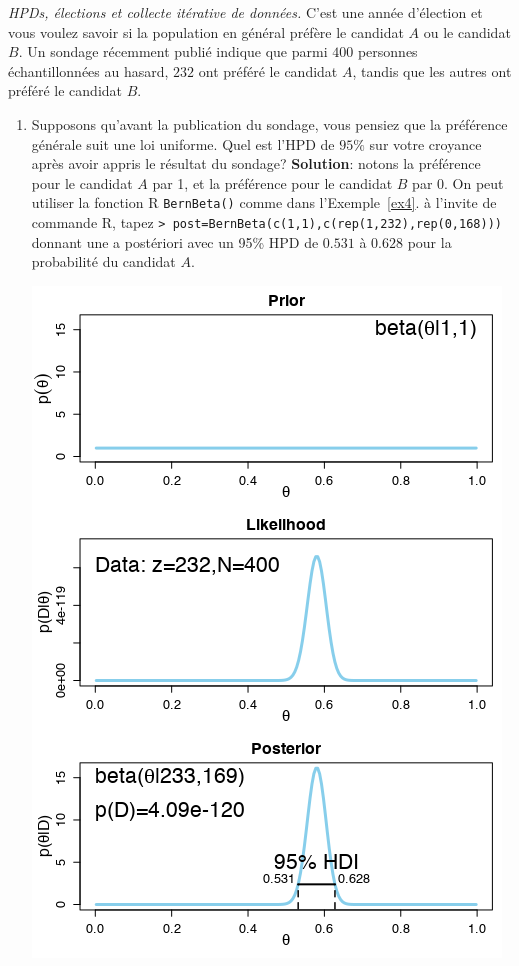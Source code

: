 \begin{Exemple}
\textit{HPDs, \'elections et collecte it\'erative de donn\'ees.} C'est une ann\'ee d'\'election et vous voulez savoir si la population en g\'en\'eral pr\'ef\`ere le candidat $A$ ou le candidat $B$. Un sondage r\'ecemment publi\'e indique que parmi $400$ personnes \'echantillonn\'ees au hasard, $232$ ont pr\'ef\'er\'e le candidat $A$, tandis que les autres ont pr\'ef\'er\'e le candidat $B$.
\begin{enumerate}[noitemsep,label=(\alph*)]
\item Supposons qu'avant la publication du sondage, vous pensiez que la pr\'ef\'erence g\'en\'erale suit une loi uniforme. Quel est l'HPD de $95\%$ sur votre croyance apr\`es avoir appris le r\'esultat du sondage?  
\newl 
\textbf{Solution}: notons la pr\'ef\'erence pour le candidat $A$ par 1, et la pr\'ef\'erence pour le candidat $B$ par 0.  On peut utiliser la fonction R  \texttt{BernBeta()} comme dans l'Exemple~\ref{ex4}. \`a l'invite de commande R, tapez
\newl \footnotesize \texttt{> post=BernBeta(c(1,1),c(rep(1,232),rep(0,168))) }\normalsize\newl
 donnant une a post\'eriori avec un  95\% HPD de $0.531$ \`a $0.628$ pour la probabilit\'e du candidat $A$.
\begin{center}		\includegraphics[width=\linewidth]{Images/example8a.png}

\end{center}
\end{enumerate}
\end{Exemple}
